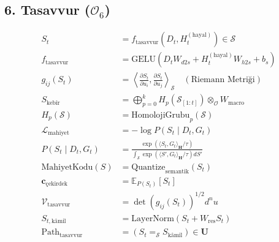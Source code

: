 \documentclass[11pt, a4paper]{article}
\begin{document}
\subsection{6. Tasavvur ($\mathcal{O}_6$)}
\begin{align}
S_t &= f_{\text{tasavvur}}(D_t, H_t^{(\text{hayal})}) \in \mathcal{S} \\
f_{\text{tasavvur}} &= \text{GELU}(D_t W_{d2s} + H_t^{(\text{hayal})} W_{h2s} + b_s) \\
g_{ij}(S_t) &= \left\langle \frac{\partial S_t}{\partial u_i}, \frac{\partial S_t}{\partial u_j} \right\rangle_{\mathcal{S}} \quad (\text{Riemann Metriği}) \\
S_{\text{kebîr}} &= \bigoplus_{p=0}^k H_p\left( \mathcal{S}_{[1:t]} \right) \otimes_{\mathcal{O}} W_{\text{macro}} \\
H_p(\mathcal{S}) &= \text{HomolojiGrubu}_p(\mathcal{S}) \\
\mathcal{L}_{\text{mahiyet}} &= -\log P(S_t \mid D_t, G_t) \\
P(S_t \mid D_t, G_t) &= \frac{\exp(\langle S_t, G_t \rangle_{\mathbf{H}} / \tau)}{\int_{\mathcal{S}} \exp(\langle S', G_t \rangle_{\mathbf{H}} / \tau) dS'} \\
\text{MahiyetKodu}(S) &= \text{Quantize}_{\text{semantik}}(S_t) \\
\mathbf{c}_{\text{çekirdek}} &= \mathbb{E}_{P(S_t)}[S_t] \\
\mathcal{V}_{\text{tasavvur}} &= \det(g_{ij}(S_t))^{1/2} d^n u \\
S_{t, \text{kâmil}} &= \text{LayerNorm}(S_t + W_{\text{res}} S_t) \\
\text{Path}_{\text{tasavvur}} &= (S_t =_{\mathcal{S}} S_{\text{kâmil}}) \in \mathbf{U}
\end{align}
\end{document}
